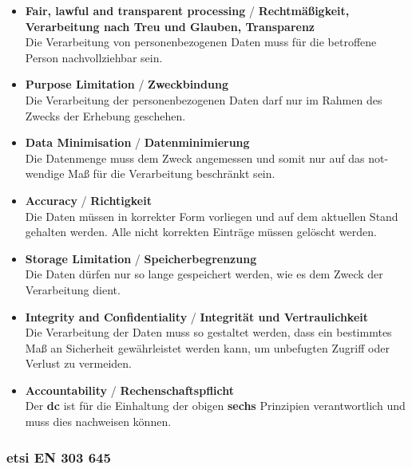 \begin{itemize}
    \item \textbf{Fair, lawful and transparent processing} / \textbf{Rechtmäßigkeit, Verarbeitung nach Treu und Glauben, Transparenz} \\ Die Verarbeitung von personenbezogenen Daten muss für die betroffene Person nachvollziehbar sein.
    \item \textbf{Purpose Limitation} / \textbf{Zweckbindung} \\ Die Verarbeitung der personenbezogenen Daten darf nur im Rahmen des Zwecks der Erhebung geschehen.
    \item \textbf{Data Minimisation} / \textbf{Datenminimierung} \\ Die Datenmenge muss dem Zweck angemessen und somit nur auf das not-wendige Maß für die Verarbeitung beschränkt sein.
    \item \textbf{Accuracy} / \textbf{Richtigkeit} \\ Die Daten müssen in korrekter Form vorliegen und auf dem aktuellen Stand gehalten werden. Alle nicht korrekten Einträge müssen gelöscht werden.
    \item \textbf{Storage Limitation} / \textbf{Speicherbegrenzung} \\ Die Daten dürfen nur so lange gespeichert werden, wie es dem Zweck der Verarbeitung dient.
    \item \textbf{Integrity and Confidentiality} / \textbf{Integrität und Vertraulichkeit} \\ Die Verarbeitung der Daten muss so gestaltet werden, dass ein bestimmtes Maß an Sicherheit gewährleistet werden kann, um unbefugten Zugriff oder Verlust zu vermeiden.
    \item \textbf{Accountability} / \textbf{Rechenschaftspflicht} \\ Der \textbf{\ac{dc}} ist für die Einhaltung der obigen \textbf{sechs} Prinzipien verantwortlich und muss dies nachweisen können.
\end{itemize}

\subsubsection{\acs{etsi} EN 303 645}
\label{sec:Grundlagen:ssec:Rechtliche Rahmenbedingungen:sssec:ETSI EN 303 645}

